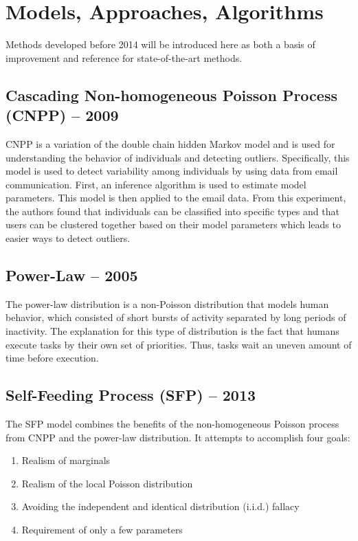 \documentclass[11pt, oneside]{article}   	%
\begin{document}
\section*{Models, Approaches, Algorithms}

\quad Methods developed before 2014 will be introduced here as both a basis of improvement and reference for state-of-the-art methods. 

\subsection*{Cascading Non-homogeneous Poisson Process (CNPP) -- 2009}

\quad CNPP is a variation of the double chain hidden Markov model and is used for understanding the behavior of individuals and detecting outliers.
Specifically, this model is used to detect variability among individuals by using data from email communication.
First, an inference algorithm is used to estimate model parameters. 
This model is then applied to the email data.
From this experiment, the authors found that individuals can be classified into specific types and that users can be clustered together based on their model parameters which leads to easier ways to detect outliers.

\subsection*{Power-Law -- 2005}

\quad The power-law distribution is a non-Poisson distribution that models human behavior, which consisted of short bursts of activity separated by long periods of inactivity.
The explanation for this type of distribution is the fact that humans execute tasks by their own set of priorities.
Thus, tasks wait an uneven amount of time before execution.

\subsection*{Self-Feeding Process (SFP) -- 2013}

\quad The SFP model combines the benefits of the non-homogeneous Poisson process from CNPP and the power-law distribution.
It attempts to accomplish four goals:
\begin{enumerate}
	\item Realism of marginals
	\item Realism of the local Poisson distribution
	\item Avoiding the independent and identical distribution (i.i.d.) fallacy
	\item Requirement of only a few parameters
\end{enumerate}
\end{document}
